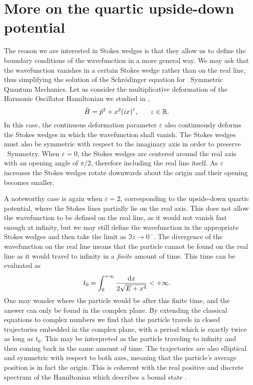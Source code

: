     \section*{More on the quartic upside-down potential}
        The reason we are interested in Stokes wedges is that they allow us to define the boundary conditions of the wavefunction in a more general way. We may ask that the wavefunction vanishes in a certain Stokes wedge rather than on the real line, thus simplifying the solution of the Schr\"odinger equation for \PT\ Symmetric Quantum Mechanics. Let us consider the multiplicative deformation of the Harmonic Oscillator Hamiltonian we studied in ,
        \begin{equation*}
            \hH = \hp^2 + x^2\pqty{i x}^\varepsilon
            \mycomma \qquad
            \varepsilon \in \bbR 
            \myperiod
        \end{equation*}
        In this case, the continuous deformation parameter $\varepsilon$ also continuously deforms the Stokes wedges in which the wavefunction shall vanish. The Stokes wedges must also be symmetric with respect to the imaginary axis in order to preserve \PT\ Symmetry. When $\varepsilon = 0$, the Stokes wedges are centered around the real axis with an opening angle of $\pi/2$, therefore including the real line itself. As $\varepsilon$ increases the Stokes wedges rotate downwards about the origin and their opening becomes smaller.

        A noteworthy case is again when $\varepsilon = 2$, corresponding to the upside-down quartic potential, where the Stokes lines partially lie on the real axis. This does not allow the wavefunction to be defined on the real line, as it would not vanish fast enough at infinity, but we may still define the wavefunction in the appropriate Stokes wedges and then take the limit as $\Im z \to 0^-$. The divergence of the wavefunction on the real line means that the particle cannot be found on the real line as it would travel to infinity in a \emph{finite} amount of time. This time can be evaluated as
        \begin{equation*}
            t_0 = \int_{0}^{+\infty} \frac{\dd{x}}{2\sqrt{E + x^4}} < +\infty
            \text{.}
        \end{equation*}
        One may wonder where the particle would be after this finite time, and the answer can only be found in the complex plane. By extending the classical equations to complex numbers we find that the particle travels in closed trajectories embedded in the complex plane, with a period which is exactly twice as long as $t_0$. This may be interpreted as the particle traveling to infinity and then coming back in the same amount of time. The trajectories are also elliptical and symmetric with respect to both axes, meaning that the particle's average position is in fact the origin. This is coherent with the real positive and discrete spectrum of the Hamiltonian which describes a bound state \cite{bender2024}.